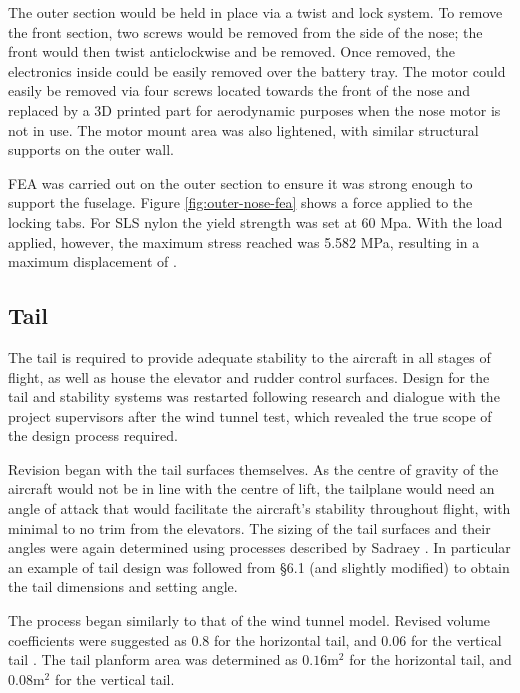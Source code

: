 \documentclass[../../main.tex]{subfiles}
\begin{document}

The outer section would be held in place via a twist and lock system.
To remove the front section, two screws would be removed from the side of the nose; the front would then twist anticlockwise and be removed.
Once removed, the electronics inside could be easily removed over the battery tray.
The motor could easily be removed via four screws located towards the front of the nose and replaced by a 3D printed part for aerodynamic purposes when the nose motor is not in use.
The motor mount area was also lightened, with similar structural supports on the  outer wall. 


FEA was carried out on the outer section to ensure it was strong enough to support the fuselage.
Figure \ref{fig:outer-nose-fea} shows a  force applied to the locking tabs.
For SLS nylon the yield strength was set at 60 Mpa.
With the  load applied, however, the maximum stress reached was 5.582 MPa, resulting in a maximum displacement of . 

\subsection{Tail} \label{sec:design-process:revised-design:tail}

The tail is required to provide adequate stability to the aircraft in all stages of flight, as well as house the elevator and rudder control surfaces.
Design for the tail and stability systems was restarted following research and dialogue with the project supervisors after the wind tunnel test, which revealed the true scope of the design process required. 

Revision began with the tail surfaces themselves.
As the centre of gravity of the aircraft would not be in line with the centre of lift, the tailplane would need an angle of attack that would facilitate the aircraft's stability throughout flight, with minimal to no trim from the elevators.
The sizing of the tail surfaces and their angles were again determined using processes described by Sadraey \cite{sadraey-13}.
In particular an example of tail design was followed from \S 6.1 (and slightly modified) to obtain the tail dimensions and setting angle. 

The process began similarly to that of the wind tunnel model.
Revised volume coefficients were suggested as 0.8 for the horizontal tail, and 0.06 for the vertical tail \cite{towell-19}.
The tail planform area was determined as $0.16 \mathrm{m^2}$ for the horizontal tail, and $0.08 \mathrm{m^2}$ for the vertical tail.  %
\end{document}
